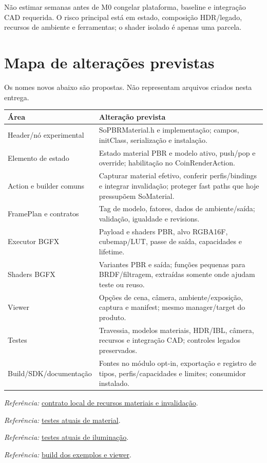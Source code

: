 \documentclass[11pt,a4paper]{article}
\newcommand{\src}[2]{\par{\small\textit{Referência:} \href{#1}{#2}.}\par}
\begin{document}
Não estimar semanas antes de M0 congelar plataforma, baseline e integração CAD requerida. O risco principal está em estado, composição HDR/legado, recursos de ambiente e ferramentas; o shader isolado é apenas uma parcela.

\section{Mapa de alterações previstas}

Os nomes novos abaixo são propostas. Não representam arquivos criados nesta entrega.

\begin{longtable}{P{.34\linewidth}P{.56\linewidth}}
\toprule Área & Alteração prevista\\\midrule\endhead
Header/nó experimental & SoPBRMaterial.h e implementação; campos, initClass, serialização e instalação.\\
Elemento de estado & Estado material PBR e modelo ativo, push/pop e override; habilitação no CoinRenderAction.\\
Action e builder comuns & Capturar material efetivo, conferir perfis/bindings e integrar invalidação; proteger fast paths que hoje pressupõem SoMaterial.\\
FramePlan e contratos & Tag de modelo, fatores, dados de ambiente/saída; validação, igualdade e revisions.\\
Executor BGFX & Payload e shaders PBR, alvo RGBA16F, cubemap/LUT, passe de saída, capacidades e lifetime.\\
Shaders BGFX & Variantes PBR e saída; funções pequenas para BRDF/filtragem, extraídas somente onde ajudam teste ou reuso.\\
Viewer & Opções de cena, câmera, ambiente/exposição, captura e manifest; mesmo manager/target do produto.\\
Testes & Travessia, modelos materiais, HDR/IBL, câmera, recursos e integração CAD; controles legados preservados.\\
Build/SDK/documentação & Fontes no módulo opt-in, exportação e registro de tipos, perfis/capacidades e limites; consumidor instalado.\\\bottomrule
\end{longtable}

\src{/mnt/Laranja/Git/externos/coin-render/docs/coin-render-material-resource-contract.md}{contrato local de recursos materiais e invalidação}
\src{/mnt/Laranja/Git/externos/coin-render/testsuite/coinrender/CoinRenderMaterialTest.cpp}{testes atuais de material}
\src{/mnt/Laranja/Git/externos/coin-render/testsuite/coinrender/CoinRenderLightingTest.cpp}{testes atuais de iluminação}
\src{/mnt/Laranja/Git/externos/coin-render/examples/coinrender/CMakeLists.txt}{build dos exemplos e viewer}
\end{document}
